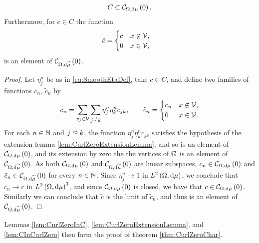 \begin{lemma} \label{lem:CInCurlZero}
	\begin{align*}
		C \subset \mathcal{C}_{ \Omega, \mathrm{d}\mu}\left( 0 \right).
	\end{align*}
	Furthermore, for $c\in C$ the function
	\begin{align*}
		\tilde{c} &= \begin{cases} c & x\not\in\mathcal{V}, \\ 0 & x\in\mathcal{V}, \end{cases}
	\end{align*}
	is an element of $\mathcal{C}_{ \Omega, \mathrm{d}\widetilde{\mu}}\left( 0 \right)$.
\end{lemma}
\begin{proof}
	Let $\eta_j^n$ be as in \eqref{eq:SmoothEtaDef}, take $c\in C$, and define two families of functions $c_n$, $\tilde{c}_n$ by
	\begin{align*}
		c_n = \sum_{v_j\in\vertSet}\sum_{j\conLeft k} \eta_j^n \eta_k^n c_{jk},
		\qquad
		\tilde{c}_n = \begin{cases} c_n & x\not\in\vertSet, \\ 0 & x\in\vertSet. \end{cases}
	\end{align*}
	For each $n\in\mathbb{N}$ and $j\conLeft k$, the function $\eta_j^n \eta_k^n c_{jk}$ satisfies the hypothesis of the extension lemma \ref{lem:CurlZeroExtensionLemma}, and so is an element of $\mathcal{C}_{ \Omega, \mathrm{d}\mu}\left( 0 \right)$, and its extension by zero the the vertices of $\mathbb{G}$ is an element of $\mathcal{C}_{ \Omega, \mathrm{d}\widetilde{\mu}}\left( 0 \right)$.
	As both $\mathcal{C}_{ \Omega, \mathrm{d}\mu}\left( 0 \right)$ and $\mathcal{C}_{ \Omega, \mathrm{d}\widetilde{\mu}}\left( 0 \right)$ are linear subspaces, $c_n\in\mathcal{C}_{ \Omega, \mathrm{d}\mu}\left( 0 \right)$ and $\tilde{c}_n\in\mathcal{C}_{ \Omega, \mathrm{d}\widetilde{\mu}}\left( 0 \right)$ for every $n\in\mathbb{N}$.
	Since $\eta_j^n\rightarrow 1$ in $L^{2}\left( \Omega,\mathrm{d} \mu \right)$, we conclude that $c_n\rightarrow c$ in $L^{2}\left( \Omega,\mathrm{d} \mu \right)^3$, and since $\mathcal{C}_{ \Omega, \mathrm{d}\mu}\left( 0 \right)$ is closed, we have that $c\in\mathcal{C}_{ \Omega, \mathrm{d}\mu}\left( 0 \right)$.
	Similarly we can conclude that $\tilde{c}$ is the limit of $\tilde{c}_n$, and thus is an element of $\mathcal{C}_{ \Omega, \mathrm{d}\widetilde{\mu}}\left( 0 \right)$.
\end{proof}
Lemmas \ref{lem:CurlZeroInC}, \ref{lem:CurlZeroExtensionLemma}, and \ref{lem:CInCurlZero} then form the proof of theorem \ref{thm:CurlZeroChar}.

